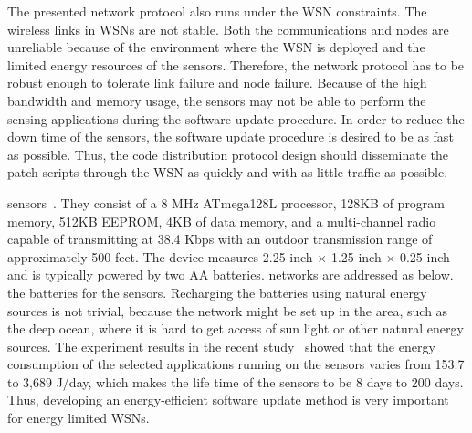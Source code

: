 The presented network protocol also runs under the WSN constraints.
The wireless links in WSNs are not stable. Both the communications and nodes are unreliable because of the environment 
where the WSN is deployed and the limited energy resources of the sensors. Therefore, the network protocol has to be 
robust enough to tolerate link failure and node failure.
Because of the high bandwidth and memory usage, the sensors may not be able to perform the sensing applications during 
the software update procedure. In order to reduce the down time of the sensors, the software update procedure is 
desired to be as fast as possible. 
Thus, the code distribution protocol design should disseminate the patch scripts through the WSN as quickly and with as 
little traffic as possible.

%
sensors~\cite{mica2-power}. They consist of a 8 MHz ATmega128L processor, 128KB of program memory, 512KB EEPROM, 4KB of 
data memory, and a multi-channel radio capable of transmitting at 38.4 Kbps with an outdoor transmission range of 
approximately 500 feet. The device measures 2.25 inch $\times$ 1.25 inch $\times$ 0.25 inch and is typically powered by 
two AA batteries.
%
networks are addressed as below.
%
the batteries for the sensors. Recharging the batteries using natural energy sources is not trivial, because the 
network might be set up in the area, such as the deep ocean, where it is hard to get access of sun light or other 
natural energy sources. 
%
The experiment results in the recent study~\cite{power-tossim} showed that the energy consumption of the selected 
applications running on the sensors varies from 153.7 to 3,689 J/day, which makes the life time of the sensors to be 8 
days to 200 days. Thus, developing an energy-efficient software update method is very important for energy limited WSNs.
%
%
